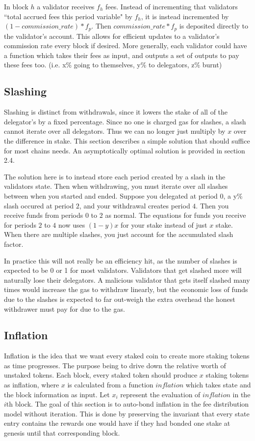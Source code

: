 \documentclass[]{article}
\begin{document}
In block $h$ a validator receives $f_h$ fees.
Instead of incrementing that validators ``total accrued fees this period variable" by $f_h$, it is instead incremented by $(1 - commission\_rate) * f_p$.
Then $commission\_rate * f_p$ is deposited directly to the validator's account.
This allows for efficient updates to a validator's commission rate every block if desired.
More generally, each validator could have a function which takes their fees as input, and outputs a set of outputs to pay these fees too. (i.e. x\% going to themselves, y\% to delegators, z\% burnt)

\subsection{Slashing}
\label{ssec:slashing}
Slashing is distinct from withdrawals, since it lowers the stake of all of the delegator's by a fixed percentage.
Since no one is charged gas for slashes, a slash cannot iterate over all delegators.
Thus we can no longer just multiply by $x$ over the difference in stake.
This section describes a simple solution that should suffice for most chains needs. An asymptotically optimal solution is provided in section 2.4.


The solution here is to instead store each period created by a slash in the validators state.
Then when withdrawing, you must iterate over all slashes between when you started and ended.
Suppose you delegated at period $0$, a y\% slash occured at period $2$, and your withdrawal creates period $4$.
Then you receive funds from periods $0$ to $2$ as normal.
The equations for funds you receive for periods $2$ to $4$ now uses $(1 - y)x$ for your stake instead of just $x$ stake.
When there are multiple slashes, you just account for the accumulated slash factor.

In practice this will not really be an efficiency hit, as the number of slashes is expected to be 0 or 1 for most validators.
Validators that get slashed more will naturally lose their delegators.
A malicious validator that gets itself slashed many times would increase the gas to withdraw linearly, but the economic loss of funds due to the slashes is expected to far out-weigh the extra overhead the honest withdrawer must pay for due to the gas.

\subsection{Inflation}
Inflation is the idea that we want every staked coin to create more staking tokens as time progresses.
The purpose being to drive down the relative worth of unstaked tokens.
Each block, every staked token should produce $x$ staking tokens as inflation, where $x$ is calculated from a function $inflation$ which takes state and the block information as input.
Let $x_i$ represent the evaluation of $inflation$ in the $i$th block.
The goal of this section is to auto-bond inflation in the fee distribution model without iteration.
This is done by preserving the invariant that every state entry contains the rewards one would have if they had bonded one stake at genesis until that corresponding block.
\end{document}
